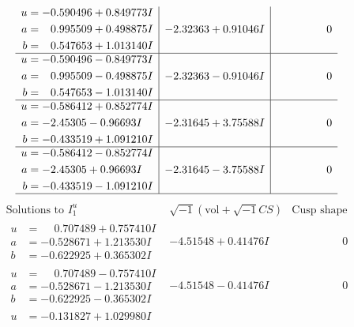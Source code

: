 \documentclass[1p]{elsarticle_modified}
\theoremstyle{definition}
\newcommand{\I}{\sqrt{-1}}
\begin{document}
$$\begin{array}{c|c|c}
\begin{aligned}
u &= -0.590496 + 0.849773 I \\
a &= \phantom{-}0.995509 + 0.498875 I \\
b &= \phantom{-}0.547653 + 1.013140 I\end{aligned}
 & -2.32363 + 0.91046 I & \phantom{-0.000000 } 0 \\ \hline\begin{aligned}
u &= -0.590496 - 0.849773 I \\
a &= \phantom{-}0.995509 - 0.498875 I \\
b &= \phantom{-}0.547653 - 1.013140 I\end{aligned}
 & -2.32363 - 0.91046 I & \phantom{-0.000000 } 0 \\ \hline\begin{aligned}
u &= -0.586412 + 0.852774 I \\
a &= -2.45305 - 0.96693 I \\
b &= -0.433519 + 1.091210 I\end{aligned}
 & -2.31645 + 3.75588 I & \phantom{-0.000000 } 0 \\ \hline\begin{aligned}
u &= -0.586412 - 0.852774 I \\
a &= -2.45305 + 0.96693 I \\
b &= -0.433519 - 1.091210 I\end{aligned}
 & -2.31645 - 3.75588 I & \phantom{-0.000000 } 0\\
 \hline 
 \end{array}$$\newpage$$\begin{array}{c|c|c}  
\text{Solutions to }I^u_{1}& \I (\text{vol} + \sqrt{-1}CS) & \text{Cusp shape}\\
 \hline 
\begin{aligned}
u &= \phantom{-}0.707489 + 0.757410 I \\
a &= -0.528671 + 1.213530 I \\
b &= -0.622925 + 0.365302 I\end{aligned}
 & -4.51548 + 0.41476 I & \phantom{-0.000000 } 0 \\ \hline\begin{aligned}
u &= \phantom{-}0.707489 - 0.757410 I \\
a &= -0.528671 - 1.213530 I \\
b &= -0.622925 - 0.365302 I\end{aligned}
 & -4.51548 - 0.41476 I & \phantom{-0.000000 } 0 \\ \hline\begin{aligned}
u &= -0.131827 + 1.029980 I \\

\end{aligned}
\end{array}$$
\end{document}
